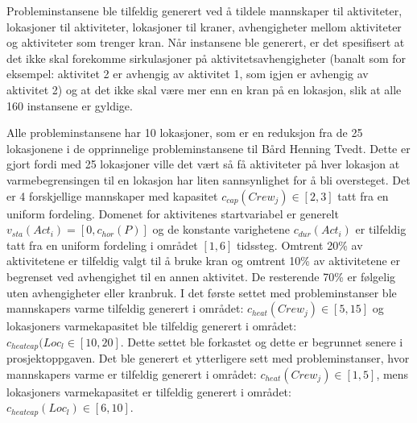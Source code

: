Probleminstansene ble tilfeldig generert ved å tildele mannskaper til aktiviteter, lokasjoner til aktiviteter, lokasjoner til kraner, avhengigheter mellom aktiviteter og aktiviteter som trenger kran. Når instansene ble generert, er det spesifisert at det ikke skal forekomme sirkulasjoner på aktivitetsavhengigheter (banalt som for eksempel: aktivitet 2 er avhengig av aktivitet 1, som igjen er avhengig av aktivitet 2) og at det ikke skal være mer enn en kran på en lokasjon, slik at alle 160 instansene er gyldige.

Alle probleminstansene har 10 lokasjoner, som er en reduksjon fra de 25 lokasjonene i de opprinnelige probleminstansene til Bård Henning Tvedt. Dette er gjort fordi med 25 lokasjoner ville det vært så få aktiviteter på hver lokasjon at varmebegrensingen til en lokasjon har liten sannsynlighet for å bli oversteget. Det er 4 forskjellige mannskaper med kapasitet $ c_{cap}(Crew_{j}) \in [2,3] $ tatt fra en uniform fordeling. Domenet for aktivitenes startvariabel er generelt $ v_{sta}(Act_{i}) = [0,c_{hor}(P)] $ og de konstante varighetene $ c_{dur}(Act_{i}) $ er tilfeldig tatt fra en uniform fordeling i området $ [1,6] $ tidssteg. Omtrent 20\% av aktivitetene er tilfeldig valgt til å bruke kran og omtrent 10\% av aktivitetene er begrenset ved avhengighet til en annen aktivitet. De resterende 70\% er følgelig uten avhengigheter eller kranbruk. I det første settet med probleminstanser ble mannskapers varme tilfeldig generert i området: $c_{heat}(Crew_{j}) \in [5,15]$ og lokasjoners varmekapasitet ble tilfeldig generert i området: $c_{heatcap}(Loc_{l} \in [10,20]$. Dette settet ble forkastet og dette er begrunnet senere i prosjektoppgaven. Det ble generert et ytterligere sett med probleminstanser, hvor mannskapers varme er tilfeldig generert i området: $c_{heat}(Crew_{j}) \in [1,5]$, mens lokasjoners varmekapasitet er tilfeldig generert i området: $c_{heatcap}(Loc_{l}) \in [6,10]$.
